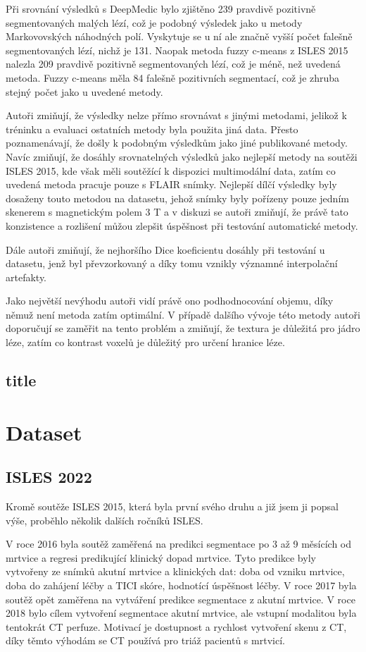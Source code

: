 \documentclass[11pt]{article}
\begin{document}
Při srovnání výsledků s DeepMedic bylo zjištěno 239 pravdivě pozitivně segmentovaných malých lézí, což je podobný výsledek jako u metody Markovovských náhodných polí. Vyskytuje se u ní ale značně vyšší počet falešně segmentovaných lézí, nichž je 131. Naopak metoda fuzzy c-means z ISLES 2015 nalezla 209 pravdivě pozitivně segmentovaných lézí, což je méně, než uvedená metoda. Fuzzy c-means měla 84 falešně pozitivních segmentací, což je zhruba stejný počet jako u uvedené metody.

Autoři zmiňují, že výsledky nelze přímo srovnávat s jinými metodami, jelikož k tréninku a evaluaci ostatních metody byla použita jiná data. Přesto poznamenávají, že došly k podobným výsledkům jako jiné publikované metody. Navíc zmiňují, že dosáhly srovnatelných výsledků jako nejlepší metody na soutěži ISLES 2015, kde však měli soutěžící k dispozici multimodální data, zatím co uvedená metoda pracuje pouze s FLAIR snímky. Nejlepší dílčí výsledky byly dosaženy touto metodou na datasetu, jehož snímky byly pořízeny pouze jedním skenerem s magnetickým polem 3 T a v diskuzi se autoři zmiňují, že právě tato konzistence a rozlišení můžou zlepšit úspěšnost při testování automatické metody.

Dále autoři zmiňují, že nejhoršího Dice koeficientu dosáhly při testování u datasetu, jenž byl převzorkovaný a díky tomu vznikly významné interpolační artefakty.

Jako největší nevýhodu autoři vidí právě ono podhodnocování objemu, díky němuž není metoda zatím optimální. V případě dalšího vývoje této metody autoři doporučují se zaměřit na tento problém a zmiňují, že textura je důležitá pro jádro léze, zatím co kontrast voxelů je důležitý pro určení hranice léze.

\subsection{title}

\section{Dataset}
\subsection{ISLES 2022}
Kromě soutěže ISLES 2015, která byla první svého druhu a již jsem ji popsal výše, proběhlo několik dalších ročníků ISLES.

V roce 2016 byla soutěž zaměřená na predikci segmentace po 3 až 9 měsících od mrtvice a regresi predikující klinický dopad mrtvice. Tyto predikce byly vytvořeny ze snímků akutní mrtvice a klinických dat: doba od vzniku mrtvice, doba do zahájení léčby a TICI skóre, hodnotící úspěšnost léčby. V roce 2017 byla soutěž opět zaměřena na vytváření predikce segmentace z akutní mrtvice. V roce 2018 bylo cílem vytvoření segmentace akutní mrtvice, ale vstupní modalitou byla tentokrát CT perfuze. Motivací je dostupnost a rychlost vytvoření skenu z CT, díky těmto výhodám se CT používá pro triáž pacientů s mrtvicí.
\end{document}
